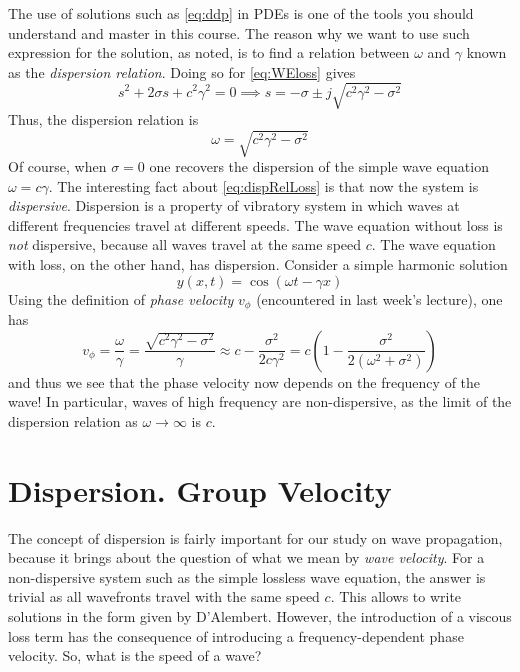 \medskip \medskip 
\noindent
The use of solutions such as \eqref{eq:ddp} in PDEs is one of the tools you should understand and master in this course. The reason why we want to use such expression for the solution, as noted, is to find a relation between $\omega$ and $\gamma$ known as the \emph{dispersion relation}. Doing so for \eqref{eq:WEloss} gives
\begin{equation}
s^2 + 2 \sigma s + c^2 \gamma^2 = 0 \implies s = - \sigma \pm j \sqrt{c^2\gamma^2 - \sigma^2}
\end{equation}
Thus, the dispersion relation is
\begin{equation}\label{eq:dispRelLoss}
\omega = \sqrt{c^2\gamma^2 - \sigma^2}
\end{equation}
Of course, when $\sigma=0$ one recovers the dispersion of the simple wave equation $\omega = c\gamma$. The interesting fact about \eqref{eq:dispRelLoss} is that now the system is \emph{dispersive}. Dispersion is a property of vibratory system in which waves at different frequencies travel at different speeds. The wave equation without loss is \emph{not} dispersive, because all waves travel at the same speed $c$. The wave equation with loss, on the other hand, has dispersion. Consider a simple harmonic solution
\begin{equation}
y(x,t) = \cos(\omega t - \gamma x) 
\end{equation}
Using the definition of \emph{phase velocity}  $v_\phi$ (encountered in last week's lecture), one has
\begin{equation}
v_\phi = \frac{\omega}{\gamma} = \frac{\sqrt{c^2 \gamma^2 - \sigma^2}}{\gamma} \approx c - \frac{\sigma^2}{2c\gamma^2} = c \left(1 - \frac{\sigma^2}{2(\omega^2+\sigma^2)} \right)
\end{equation}
and thus we see that the phase velocity now depends on the frequency of the wave! In particular, waves of high frequency are non-dispersive, as the limit of the dispersion relation as $\omega \rightarrow \infty$ is $c$.


\section{Dispersion. Group Velocity}

The concept of dispersion is fairly important for our study on wave propagation, because it brings about the question of what we mean by \emph{wave velocity}. For a non-dispersive system such as the simple lossless wave equation, the answer is trivial as all wavefronts travel with the same speed $c$. This allows to write solutions in the form given by D'Alembert. However, the introduction of a viscous loss term has the consequence of introducing a frequency-dependent phase velocity. So, what is the speed of a wave? 

